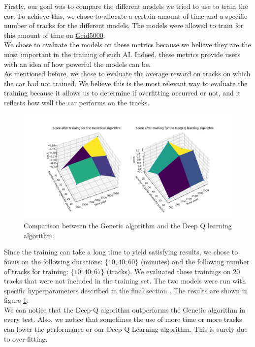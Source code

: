 \documentclass[11pt,a4paper]{article}
\newcounter{fig}
\begin{document}
Firstly, our goal was to compare the different models we tried to use to train the car. To achieve this, we chose to allocate a certain amount of time and a specific number of tracks for the different models. The models were allowed to train for this amount of time on \href{https://www.grid5000.fr}{Grid5000}.\\

We chose to evaluate the models on these metrics because we believe they are the most important in the training of such AI. Indeed, these metrics provide users with an idea of how powerful the models can be.\\

As mentioned before, we chose to evaluate the average reward on tracks on which the car had not trained. We believe this is the most relevant way to evaluate the training because it allows us to determine if overfitting occurred or not, and it reflects how well the car performs on the tracks.
        \begin{figure}[h]
            \centering
            \includegraphics[scale = 0.55]{graphe_comparaison.png}
            \caption{Comparison between the Genetic algorithm and the Deep Q learning algorithm.}
            \label{figure:compare GA VS DQ}
        \end{figure}
\newpage
Since the training can take a long time to yield satisfying results, we chose to focus on the following durations: $\{10;40;60\}$ (minutes) and the following number of tracks for training: $\{10;40;67\}$ 
(tracks). We evaluated these trainings on $20$ tracks that were not included in the 
training set. The two models were run with specific hyperparameters described in the final section \pageref{Hyperparameters}. 
The results are shown in figure \ref{figure:compare GA VS DQ}.\\
We can notice that the Deep-Q algorithm outperforms the Genetic algorithm in every test. Also, we notice that sometimes the use of more time or more tracks can lower the performance or our Deep Q-Learning algorithm. This is surely due to over-fitting.\\
\end{document}
